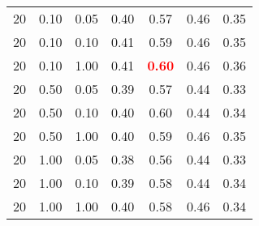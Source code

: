 \begin{tabular}{lllcccc}
20 & 0.10 & 0.05 & 0.40 & 0.57 & 0.46 & 0.35 \\ 
20 & 0.10 & 0.10 & 0.41 & 0.59 & 0.46 & 0.35 \\ 
20 & 0.10 & 1.00 & 0.41 & \textbf{\textcolor{red}{0.60}} & 0.46 & 0.36 \\ 
20 & 0.50 & 0.05 & 0.39 & 0.57 & 0.44 & 0.33 \\ 
20 & 0.50 & 0.10 & 0.40 & 0.60 & 0.44 & 0.34 \\ 
20 & 0.50 & 1.00 & 0.40 & 0.59 & 0.46 & 0.35 \\ 
20 & 1.00 & 0.05 & 0.38 & 0.56 & 0.44 & 0.33 \\ 
20 & 1.00 & 0.10 & 0.39 & 0.58 & 0.44 & 0.34 \\ 
20 & 1.00 & 1.00 & 0.40 & 0.58 & 0.46 & 0.34 \\ 
\end{tabular} 
